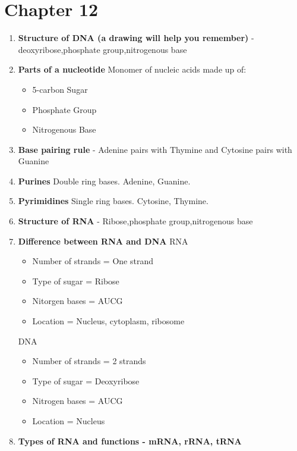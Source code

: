 \documentclass[9pt]{article}
\begin{document}
\section*{Chapter 12}
\begin{enumerate}
  \item {\bf Structure of DNA (a drawing will help you remember)} - deoxyribose,phosphate group,nitrogenous base
  \item {\bf Parts of a nucleotide} Monomer of nucleic acids made up of:
    \begin{itemize}
      \item 5-carbon Sugar
      \item Phosphate Group
      \item Nitrogenous Base
    \end{itemize}
  \item {\bf Base pairing rule} - Adenine pairs with Thymine and Cytosine pairs with Guanine
  \item {\bf Purines} Double ring bases. Adenine, Guanine.
  \item {\bf Pyrimidines} Single ring bases. Cytosine, Thymine.
  \item {\bf Structure of RNA} - Ribose,phosphate group,nitrogenous base
  \item {\bf Difference between RNA and DNA}
  RNA
  \begin{itemize}
    \item Number of strands = One strand
    \item Type of sugar = Ribose
    \item Nitorgen bases =  AUCG
    \item Location = Nucleus, cytoplasm, ribosome
  \end{itemize}
  DNA
  \begin{itemize}
    \item Number of strands = 2 strands
    \item Type of sugar = Deoxyribose
    \item Nitrogen bases = AUCG
    \item Location = Nucleus
  \end{itemize}
  \item {\bf Types of RNA and functions  -  mRNA, rRNA, tRNA}
  

\end{enumerate}
\end{document}
